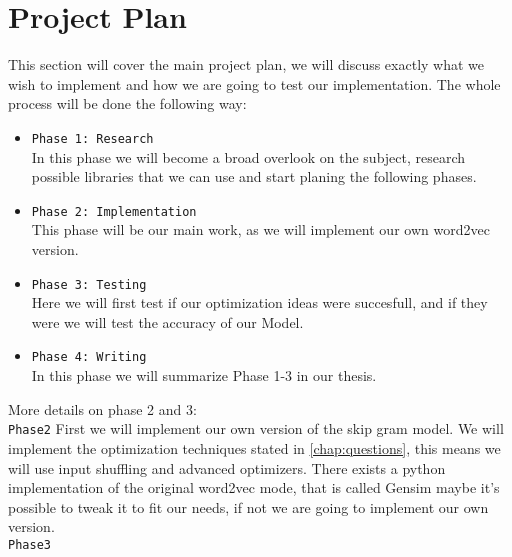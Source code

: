 \chapter{Project Plan}\label{chap:introduction}

This section will cover the main project plan, we will discuss exactly what we wish to implement and how we are going to test our implementation. 
The whole process will be done the following way: 
\begin{itemize}
\item \texttt{Phase 1: Research} \\ In this phase we will become a broad overlook on the subject, research possible libraries that we can use and start planing the following phases.
\item \texttt{Phase 2: Implementation} \\ This phase will be our main work, as we will implement our own word2vec version.
\item \texttt{Phase 3: Testing} \\ Here we will first test if our optimization ideas were succesfull, and if they were we will test the accuracy of our Model. 
\item \texttt{Phase 4: Writing} \\ In this phase we will summarize Phase 1-3 in our thesis. 
\end{itemize}
More details on phase 2 and 3:\\
\texttt{Phase2}
First we will implement our own version of the skip gram model. We will implement the optimization techniques stated in \ref{chap:questions}, this means we will use input shuffling and  advanced optimizers.  There exists a python implementation of the original word2vec mode, that is called Gensim \cite{gensim}maybe it's possible to tweak it to fit our needs, if not we are going to implement our own version. \\
\texttt{Phase3}
